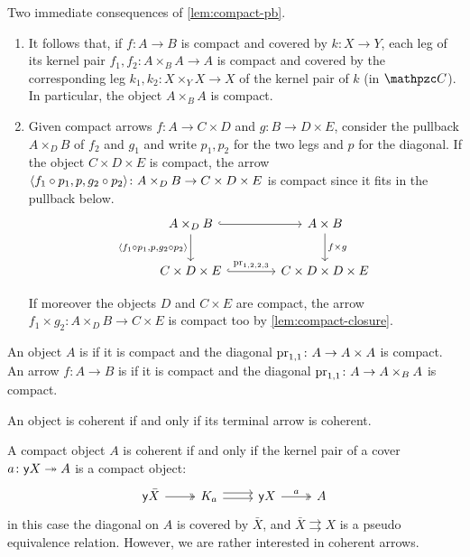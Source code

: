 \documentclass[a4paper,11pt]{amsart}
\newcommand{\covers}{\twoheadrightarrow}
\begin{document}
\begin{rmk}\label{rmk:compact-pb}
Two immediate consequences of \cref{lem:compact-pb}.
\begin{enumerate}
	\item\label{rmk:compact-pb:ker}
	It follows that, if $f\colon A\to B$ is compact and covered by $k\colon X\to Y$,
	each leg of its kernel pair $f_1,f_2\colon A\times_BA \to A$ is compact and covered by the corresponding leg $k_1,k_2\colon X\times_YX\to X$ of the kernel pair of $k$ (in $\Ccat$).
	In particular, the object $A\times_B A$ is compact.
	\item\label{rmk:compact-pb:mix}
	Given compact arrows $f\colon A\to C\times D$ and $g\colon B\to D\times E$,
	consider the pullback $A\times_DB$ of $f_2$ and $g_1$ and write $p_1, p_2$ for the two legs and $p$ for the diagonal.
	If the object $C\times D\times E$ is compact,
	the arrow $\langle{f_1\mathbin{\circ}p_1,p,g_2\mathbin{\circ}p_2}\rangle\colon A\times_D B \to C\times D\times E$ is compact since it fits in the pullback below.
	\[\begin{tikzcd}[column sep=9ex,row sep=5ex]
		A\times_DB	\ar[d,"{\ple{f_1\arcmp p_1,p,g_2\arcmp p_2}}"'] \ar[r,hook]	&	A\times B	\ar[d,"f\times g"]
		\\
		C\times D\times E	\ar[r,"{\pr{1,2,2,3}}",hook]	&	C\times D\times D\times E
	\end{tikzcd}\]
	
	If moreover the objects $D$ and $C\times E$ are compact,
	the arrow $f_1\times g_2\colon A\times_DB\to C\times E$ is compact too by \cref{lem:compact-closure}.
\end{enumerate}
\end{rmk}

An object $A$ is  if it is compact
and the diagonal ${\mathrm{pr}}_{1,1}\colon A\to A\times A$ is compact.
An arrow $f\colon A\to B$ is  if it is compact
and the diagonal ${\mathrm{pr}}_{1,1}\colon A\to A\times_B A$ is compact.

An object is coherent if and only if its terminal arrow is coherent.

A compact object $A$ is coherent if and only if the kernel pair of a cover $a\colon \yo X\covers A$ is a compact object:
\[\begin{tikzcd}
	\yo \bar{X}	\ar[r,two heads]	&	K_a	\ar[r,shift left=.7ex] \ar[r,shift right=.3ex]	&	\yo X	\ar[r,"a",two heads]	&	A
\end{tikzcd}\]
in this case the diagonal on $A$ is covered by $\bar{X}$,
and $\bar{X}\rightrightarrows X$ is a pseudo equivalence relation.
%
However, we are rather interested in coherent arrows.
\end{document}
